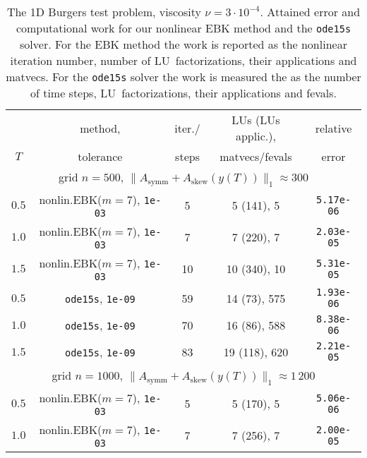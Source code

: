 \documentclass[sn-aps]{sn-jnl}
\theoremstyle{thmstyleone}%
\theoremstyle{thmstyletwo}%
\theoremstyle{thmstylethree}%
\newcommand{\Asymm}{A_{\mathrm{symm}}}
\newcommand{\Askew}{A_{\mathrm{skew}}}
\begin{document}
\begin{table}
\caption{The 1D Burgers test problem, viscosity $\nu = 3\cdot 10^{-4}$.  
Attained error and 
computational work for our nonlinear EBK method and 
the \texttt{ode15s} solver. 
For the EBK method the work is reported as the nonlinear iteration number,
number of LU~factorizations, their applications and matvecs.
For the \texttt{ode15s} solver the work is measured the 
as the number of time steps, LU~factorizations, their applications and fevals.}
\label{t:Brg}  

\renewcommand{\arraystretch}{1.1} %
\begin{tabular}{ccccc}
\hline\hline
      &  method,            & iter./& LUs (LUs applic.), & relative\\ 
$T$   & tolerance           & steps & matvecs/fevals     & error \\
\hline
\multicolumn{5}{c}{grid $n=500$, $\|\Asymm  + \Askew (y(T))\|_1\approx 300$}\\
$0.5$  & nonlin.EBK($m=7$), {\tt 1e-03} & 5     & 5 (141), 5         & {\tt 5.17e-06} \\
$1.0$  & nonlin.EBK($m=7$), {\tt 1e-03} & 7     & 7 (220), 7         & {\tt 2.03e-05} \\
$1.5$  & nonlin.EBK($m=7$), {\tt 1e-03} & 10    & 10 (340), 10       & {\tt 5.31e-05} \\
$0.5$  & {\tt ode15s},  {\tt 1e-09}     & 59    & 14 (73), 575       & {\tt 1.93e-06} \\
$1.0$  & {\tt ode15s},  {\tt 1e-09}     & 70    & 16 (86), 588       & {\tt 8.38e-06} \\
$1.5$  & {\tt ode15s},  {\tt 1e-09}     & 83    & 19 (118), 620      & {\tt 2.21e-05} \\
\hline
\multicolumn{5}{c}{grid $n=1000$, $\|\Asymm  + \Askew (y(T))\|_1\approx 1\,200$}\\
$0.5$  & nonlin.EBK($m=7$), {\tt 1e-03} & 5     & 5 (170), 5         & {\tt 5.06e-06} \\
$1.0$  & nonlin.EBK($m=7$), {\tt 1e-03} & 7     & 7 (256), 7         & {\tt 2.00e-05} \\

\end{tabular}
\end{table}
\end{document}
